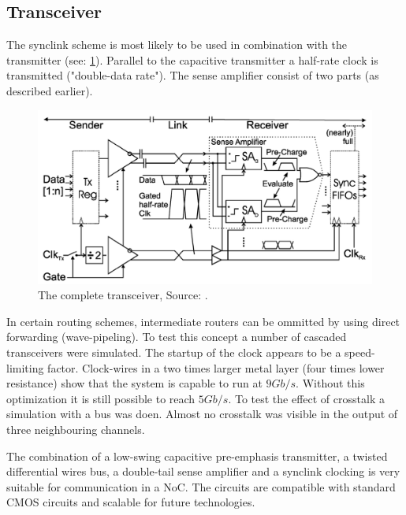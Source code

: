 \subsection{Transceiver} \label{sss:rep2:transceiver}
The \ac{synclink} scheme is most likely to be used in combination with the transmitter (see: \cref{fig:rep2:transceiver}).
Parallel to the capacitive transmitter a half-rate clock is transmitted ("double-data rate").
The sense amplifier consist of two parts (as described earlier).


\begin{figure}	\centering
	
	\includegraphics[width=0.9\linewidth]{Figures/Rep2Transceiver.png}
	\caption{The complete transceiver, Source: \cite{schinkel2009low}.} 
    \label{fig:rep2:transceiver}
\end{figure}


In certain routing schemes, intermediate routers can be ommitted by using direct forwarding (wave-pipeling).
To test this concept a number of cascaded transceivers were simulated.
The startup of the clock appears to be a speed-limiting factor.
Clock-wires in a two times larger metal layer (four times lower resistance) show that the system is capable to run at $9 Gb/s$.
Without this optimization it is still possible to reach $5 Gb/s$.
To test the effect of crosstalk a simulation with a bus was doen.
Almost no crosstalk was visible in the output of three neighbouring channels.

The combination of a low-swing capacitive pre-emphasis transmitter, a twisted differential wires bus, a double-tail sense amplifier and a \ac{synclink} clocking is very suitable for communication in a NoC.
The circuits are compatible with standard CMOS circuits and scalable for future technologies.